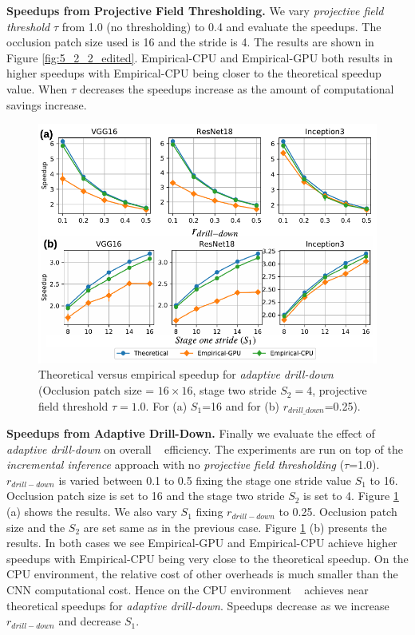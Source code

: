 \vspace{2mm}
\noindent \textbf{Speedups from Projective Field Thresholding.} We vary \textit{projective field threshold} $\tau$ from 1.0 (no thresholding) to 0.4 and evaluate the speedups.
The occlusion patch size used is 16 and the stride is 4.
The results are shown in Figure \ref{fig:5_2_2_edited}.
Empirical-CPU and Empirical-GPU both results in higher speedups with Empirical-CPU being closer to the theoretical speedup value.
When $\tau$ decreases the speedups increase as the amount of computational savings increase.

\begin{figure}[t]
\includegraphics[width=\columnwidth]{images/5_2_3_edited}
\caption{Theoretical versus empirical speedup for \textit{adaptive drill-down} (Occlusion patch size = $16 \times 16$, stage two stride $S_2=4$, projective field threshold $\tau=1.0$. For (a) $S_1$=16 and for (b) $r_{drill\_down}$=0.25).}
\label{fig:5_2_3_edited}
\end{figure}

\vspace{2mm}
\noindent \textbf{Speedups from Adaptive Drill-Down.} Finally we evaluate the effect of \textit{adaptive drill-down} on overall \system~ efficiency.
The experiments are run on top of the \textit{incremental inference} approach with no \textit{projective field thresholding} ($\tau$=1.0).
$r_{drill-down}$ is varied between 0.1 to 0.5 fixing the stage one stride value $S_1$ to 16.
Occlusion patch size is set to 16 and the stage two stride $S_2$ is set to 4.
Figure \ref{fig:5_2_3_edited} (a) shows the results.
We also vary $S_1$ fixing $r_{drill-down}$ to 0.25.
Occlusion patch size and the $S_2$ are set same as in the previous case.
Figure \ref{fig:5_2_3_edited} (b) presents the results.
In both cases we see Empirical-GPU and Empirical-CPU achieve higher speedups with Empirical-CPU being very close to the theoretical speedup.
On the CPU environment, the relative cost of other overheads is much smaller than the CNN computational cost.
Hence on the CPU environment \system~ achieves near theoretical speedups for \textit{adaptive drill-down}.
Speedups decrease as we increase $r_{drill-down}$ and decrease $S_1$.

